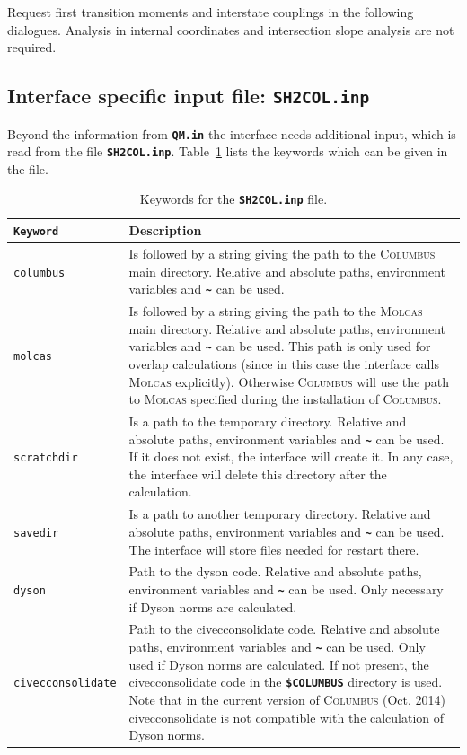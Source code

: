 \documentclass[a4paper,11pt,DIV=15,openany,twoside=false]{scrbook}
\newcommand{\ttt}[1]{\textbf{\texttt{#1}}}
\begin{document}
Request first transition moments and interstate couplings in the following dialogues. Analysis in internal coordinates and intersection slope analysis are not required.

\subsection{Interface specific input file: \ttt{SH2COL.inp}}

Beyond the information from \ttt{QM.in} the interface needs additional input, which is read from the file \ttt{SH2COL.inp}. Table~\ref{tab:columbus_sh2} lists the keywords which can be given in the file.

\begin{table}
  \centering
  \caption{Keywords for the \ttt{SH2COL.inp} file.}
  \label{tab:columbus_sh2}
  \begin{tabular}{>{\tt}lp{12cm}}
  \toprule
  Keyword       &Description\\
  \midrule
columbus        &Is followed by a string giving the path to the \textsc{Columbus} main directory. Relative and absolute paths, environment variables and \ttt{\textasciitilde} can be used.\\
molcas          &Is followed by a string giving the path to the \textsc{Molcas} main directory.  Relative and absolute paths, environment variables and \ttt{\textasciitilde} can be used. This path is only used for overlap calculations (since in this case the interface calls \textsc{Molcas} explicitly). Otherwise \textsc{Columbus} will use the path to \textsc{Molcas} specified during the installation of \textsc{Columbus}.\\
scratchdir      &Is a path to the temporary directory. Relative and absolute paths, environment variables and \ttt{\textasciitilde} can be used. If it does not exist, the interface will create it. In any case, the interface will delete this directory after the calculation.\\
savedir         &Is a path to another temporary directory.  Relative and absolute paths, environment variables and \ttt{\textasciitilde} can be used. The interface will store files needed for restart there.\\
dyson           &Path to the dyson code. Relative and absolute paths, environment variables and \ttt{\textasciitilde} can be used. Only necessary if Dyson norms are calculated.\\
civecconsolidate&Path to the civecconsolidate code. Relative and absolute paths, environment variables and \ttt{\textasciitilde} can be used. Only used if Dyson norms are calculated. If not present, the civecconsolidate code in the \ttt{\$COLUMBUS} directory is used. Note that in the current version of \textsc{Columbus} (Oct. 2014) civecconsolidate is not compatible with the calculation of Dyson norms.\\

\end{tabular}
\end{table}
\end{document}
